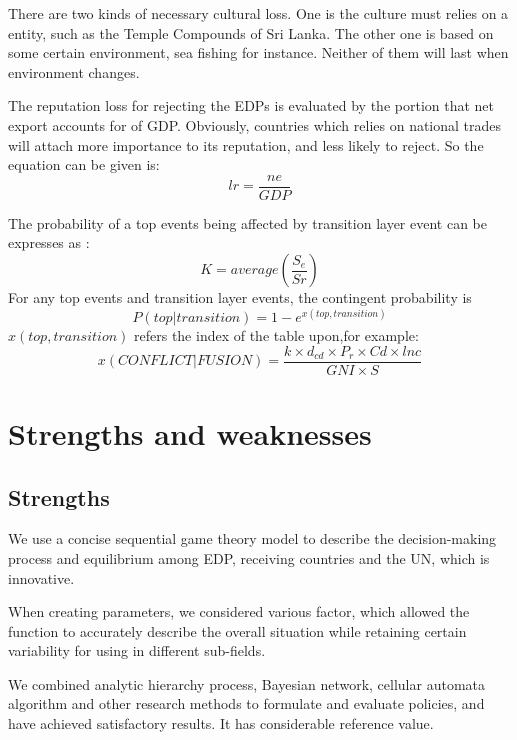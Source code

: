 \documentclass{mcmthesis}
\begin{document}
There are two kinds of necessary cultural loss. One is the culture must relies on a entity, such as the Temple Compounds of Sri Lanka. The other one is based on some certain environment, sea fishing for instance. Neither of them will last when environment changes.

The reputation loss for rejecting the EDPs is evaluated by the portion that net export accounts for of GDP. Obviously, countries which relies on national trades will attach more importance to its reputation, and less likely to reject. So the equation can be given is:
\begin{equation}
lr=\frac{ne}{GDP}
\end{equation}

The probability of a top events being affected by transition layer event can be expresses as :
\begin{equation}
K= average(\frac{S_{e}}{Sr})
\end{equation}
For any top events and transition layer events, the contingent probability is 
\begin{equation}
P(top{\vert}transition)=1-e^{x(top,transition)}
\end{equation}
$ x(top,transition) $ refers the index of the table upon,for example:
\begin{equation}
x(CONFLICT{\vert}FUSION)=\dfrac{k{\times}d_{cd}{\times}P_{r}{\times}Cd{\times}lnc}{GNI{\times}S}
\end{equation}





\section{Strengths and weaknesses}
\subsection{Strengths}
We use a concise sequential game theory model to describe the decision-making process and equilibrium among EDP, receiving countries and the UN, which is innovative.

When creating parameters, we considered various factor, which allowed the function to accurately describe the overall situation while retaining certain variability for using in different sub-fields.

We combined analytic hierarchy process, Bayesian network, cellular automata algorithm and other research methods to formulate and evaluate policies, and have achieved satisfactory results. It has considerable reference value.
\end{document}
